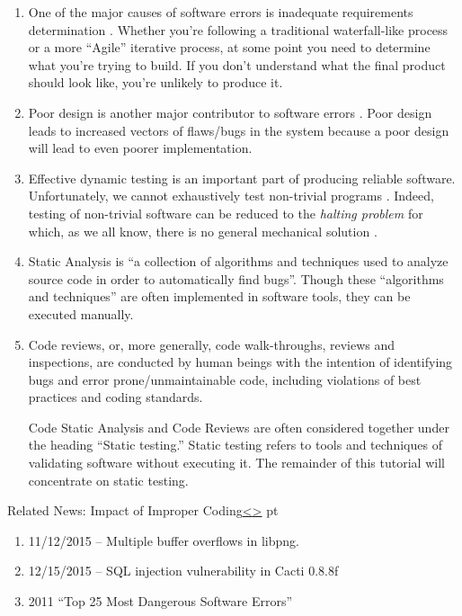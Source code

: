 \documentclass[12pt]{extarticle}
\newenvironment{instructionblock}{\Large\bgroup}{\egroup}
\begin{document}
\begin{enumerate}
\item One of the major causes of software errors is inadequate requirements determination \cite{SoftwareReq}.  Whether you're following a traditional waterfall-like process or a more ``Agile'' iterative process, at some point you need to determine what you're trying to build.  If you don't understand what the final product should look like, you're unlikely to produce it.
\item Poor design is another major contributor to software errors \cite{Design}. Poor design leads to increased vectors of flaws/bugs in the system because a poor design will lead to even poorer implementation.
\item Effective dynamic testing is an important part of producing reliable software.  Unfortunately, we cannot exhaustively test non-trivial programs \cite{Test}.  Indeed, testing of non-trivial software can be reduced to the \textit{halting problem} \cite{WikipediaStaticAnalysis} for which, as we all know, there is no general mechanical solution \cite{WikipediaHaltingProblem}.
\item Static Analysis is ``a collection of algorithms and techniques used to analyze source code in order to automatically find bugs''\cite{Clang}.  Though these ``algorithms and techniques'' are often implemented in software tools, they can be executed manually.
\item Code reviews, or, more generally, code walk-throughs, reviews and inspections, are conducted by human beings with the intention of identifying bugs and error prone/unmaintainable code, including violations of best practices and coding standards.\cite{CodeReview}

Code Static Analysis and Code Reviews are often considered together under the heading ``Static testing.''  Static testing refers to tools and techniques of validating software without executing it.\cite{StaticTesting}  The remainder of this tutorial will concentrate on static testing.
\end{enumerate}




\pagebreak
\begin{slide}{Related News: Impact of Improper Coding}{\hyperref[slide 5]{\textless}\hyperref[slide 7]{\textgreater}}
 pt
\begin{instructionblock}
\begin{enumerate}
	\item 11/12/2015 -- Multiple buffer overflows in libpng\cite{CVE-2015-8126}.
	\item 12/15/2015 -- SQL injection vulnerability in Cacti 0.8.8f\cite{CVE-2015-8377}
	\item 2011 ``Top 25 Most Dangerous Software Errors''\cite{CommonWeaknessEnumeration}
\end{enumerate}
\end{instructionblock}
\end{slide}
\end{document}
